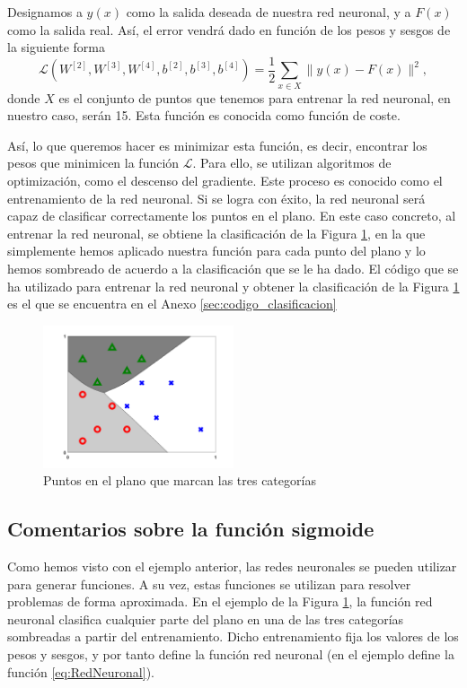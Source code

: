 \documentclass[a4paper,11pt,spanish, twoside, leqno]{tfg-uam}
\theoremstyle{definition}
\begin{document}
Designamos a $y(x)$ como la salida deseada de nuestra red neuronal, y a $F(x)$ como la salida real. Así, el error vendrá dado en función de los pesos y sesgos de la siguiente forma
\begin{equation*}
    \mathcal{L}(W^{[2]},W^{[3]},W^{[4]},b^{[2]},b^{[3]},b^{[4]})=\frac{1}{2}\sum_{x\in X}\|y(x)-F(x)\|^2,
\end{equation*}
donde $X$ es el conjunto de puntos que tenemos para entrenar la red neuronal, en nuestro caso, serán 15. Esta función es conocida como función de coste.

Así, lo que queremos hacer es minimizar esta función, es decir, encontrar los pesos que minimicen la función $\mathcal{L}$. Para ello, se utilizan algoritmos de optimización, como el descenso del gradiente. Este proceso es conocido como el entrenamiento de la red neuronal. Si se logra con éxito, la red neuronal será capaz de clasificar correctamente los puntos en el plano. En este caso concreto, al entrenar la red neuronal, se obtiene la clasificación de la Figura \ref{fig:ClasificacionFinal}, en la que simplemente hemos aplicado nuestra función para cada punto del plano y lo hemos sombreado de acuerdo a la clasificación que se le ha dado. El código que se ha utilizado para entrenar la red neuronal y obtener la clasificación de la Figura \ref{fig:ClasificacionFinal} es el que se encuentra en el Anexo \ref{sec:codigo_clasificacion}

\begin{figure}
    \centering
    \includegraphics[width=0.5\textwidth]{Figuras/classifier_back.png}
    \caption{Puntos en el plano que marcan las tres categorías}
    \label{fig:ClasificacionFinal}
\end{figure}

\subsection{Comentarios sobre la función sigmoide}\label{subsec:Sigmoide}
Como hemos visto con el ejemplo anterior, las redes neuronales se pueden utilizar para generar funciones. A su vez, estas funciones se utilizan para resolver problemas de forma aproximada. En el ejemplo de la Figura \ref{fig:ClasificacionFinal}, la función red neuronal clasifica cualquier parte del plano en una de las tres categorías sombreadas a partir del entrenamiento. Dicho entrenamiento fija los valores de los pesos y sesgos, y por tanto define la función red neuronal (en el ejemplo define la función \eqref{eq:RedNeuronal}).
\end{document}
